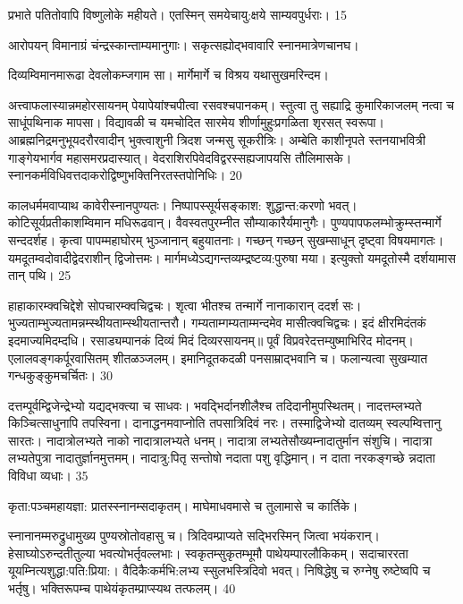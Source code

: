  प्रभाते पतितोवापि विष्णुलोके महीयते।
 एतस्मिन् समयेचायु:क्षये साम्यवपुर्धराः। 15 

 आरोपयन् विमानाग्रं चंन्द्रस्कान्ताम्यमानुगाः।
 सकृत्सह्योद्भवावारि स्नानमात्रेणचानघ।
 
 दिव्यम्विमानमारूढा देवलोकम्जगाम सा।
 मार्गेमार्गे च विश्रय यथासुखमरिन्दम।
 

अत्त्वाफलास्यान्नमहोरसायनम् पेयापेयांश्चपीत्वा रसवश्चपानकम्।
 स्तुत्वा तु सह्याद्रि कुमारिकाजलम् नत्वा च साधूंपथिनाक मापसा।
 विद्यावळी च यमचोदित सारमेय शीर्णामुहुःप्रगळिता शृरसत् स्वरूपा।
 आब्रह्मनिद्रमनुभूयदरौरवादीन् भुक्त्वाशुनी त्रिदश जन्मसु सूकरीत्रिः।
 अम्बेति काशीनृपते स्तनयाभवित्री गाङ्गेयभार्गव महासमरप्रदास्यात्।
 वेदराशिरपिवेदविद्वरस्सह्यजापयसि तौलिमासके।
 स्नानकर्मविधिवत्तदाकरोद्विष्णुभक्तिनिरतस्तपोनिधिः।
 20

  कालधर्ममवाप्याथ कावेरीस्नानपुण्यतः।
 निष्पापस्सूर्यसङ्काश: शुद्धान्त:करणो भवत्।
 कोटिसूर्यप्रतीकाशम्विमान मधिरूढवान्।
 वैवस्वतपुरम्नीत सौम्याकारैर्यमानुगैः।
 पुण्यपापफलम्भोक्रुम्स्तन्मार्गे सन्ददर्शह।
 कृत्वा पापम्महाघोरम् भुञ्जानान् बहुयातनाः।
 गच्छन् गच्छन् सुखम्साधून् दृष्ट्वा विषयमागतः।
 यमदूतम्वदोवादीद्वेदराशीन् द्विजोत्तमः।
 मार्गमध्येऽद्यगन्तव्यम्द्रष्टव्य:पुरुषा मया।
 इत्युक्तो यमदूतोस्मै दर्शयामास तान् पथि।
 25

 

हाहाकारम्क्वचिद्देशे सोपचारम्क्वचिद्वचः।
 शृत्वा भीतश्च तन्मार्गे नानाकारान् ददर्श सः।
 भुज्यताम्भुज्यतामन्नम्स्थीयताम्स्थीयतान्तरौ।
 गम्यताम्गम्यताम्मन्दमेव मासीत्क्वचिद्वचः।
 इदं क्षीरमिदंतकं इदमाज्यमिदम्दधि।
 रसाड्यम्पानकं दिव्यं मिदं दिव्यरसायनम्॥ पूर्वं विप्रवरेदत्तम्युष्माभिरिद मोदनम्।
 एलालवङ्गकर्पूरवासितम् शीतळञ्जलम्।
 इमानिदूतकदळी पनसाम्राद्भवानि च।
 फलान्यत्वा सुखम्यात गन्धकुङ्कुमचर्चितः।
 30

  दत्तम्पूर्वम्द्विजेन्द्रेभ्यो यद्यद्भक्त्या च साधवः।
 भवद्भिर्दानशीलैश्च तदिदानीमुपस्थितम्।
 नादत्तम्लभ्यते किञ्चित्साधुनापि तपस्विना।
 दानाद्धनमवाप्नोति तपसात्रिदिवं नरः।
 तस्माद्विजेभ्यो दातव्यम् स्वल्पम्वित्तानु सारतः।
 नादात्रोलभ्यते नाको नादात्रालभ्यते धनम्।
 नादात्रा लभ्यतेसौख्यम्नादातुर्मान संशुचि।
 नादात्रा लभ्यतेपुत्रा नादातुर्ज्ञानमुत्तमम्।
 नादात्रु:पितृ सन्तोषो नदाता पशु वृद्धिमान्।
 न दाता नरकङ्गच्छे न्नदाता विविधा व्यधाः।
 35

  कृता:पञ्चमहायज्ञा: प्रातस्स्नानम्सदाकृतम्।
 माघेमाधवमासे च तुलामासे च कार्तिके।
 

स्नानानम्मरुद्रुधामुख्य पुण्यस्रोतोवहासु च।
 त्रिदिवम्प्राप्यते सद्भिरस्मिन् जित्वा भयंकरान्।
 हेसाघ्योऽरुन्दतीतुल्या भवत्योभर्तृवल्लभाः।
 स्वकृतम्सुकृतम्भूमौ पाथेयम्पारलौकिकम्।
 सदाचाररता यूयम्नित्यशुद्धा:पति:प्रिया:।
 वैदिकैःकर्मभि:लभ्य स्सुलभस्त्रिदिवो भवत्।
 निषिद्धेषु च रुग्नेषु रुष्टेष्वपि च भर्तृषु।
 भक्तिरूपम्च पाथेयंकृतम्प्राप्स्यथ तत्फलम्।
 40

